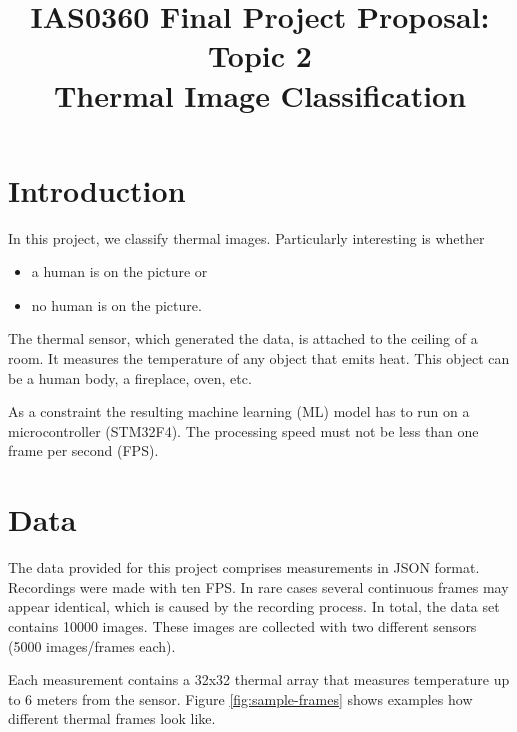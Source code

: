 \documentclass[10pt,letterpaper,conference]{IEEEtran}
\begin{document}
\title{IAS0360 Final Project Proposal: Topic 2\\ Thermal Image Classification}

\author{
}

\maketitle

\section{Introduction}
In this project, we classify thermal images. Particularly interesting is
whether 
\begin{itemize}
  \item a human is on the picture or
  \item no human is on the picture.
\end{itemize}
The thermal sensor, which generated the data, is attached to the ceiling of a room. 
It measures the temperature of any object that emits heat. 
This object can be a human body, a fireplace, oven, etc.

As a constraint the resulting machine learning (ML) model has to run on a microcontroller (STM32F4).
The processing speed must not be less than one frame per second (FPS).

\section{Data}
The data provided for this project comprises measurements in JSON format. 
Recordings were made with ten FPS. 
In rare cases several continuous frames may appear identical, 
which is caused by the recording process.
In total, the data set contains 10000 images. 
These images are collected with two different sensors (5000 images/frames each).

Each measurement contains a 32x32 thermal array that measures temperature up to 6 meters from the sensor. 
Figure \ref{fig:sample-frames} shows examples how different thermal frames look like.
\end{document}
